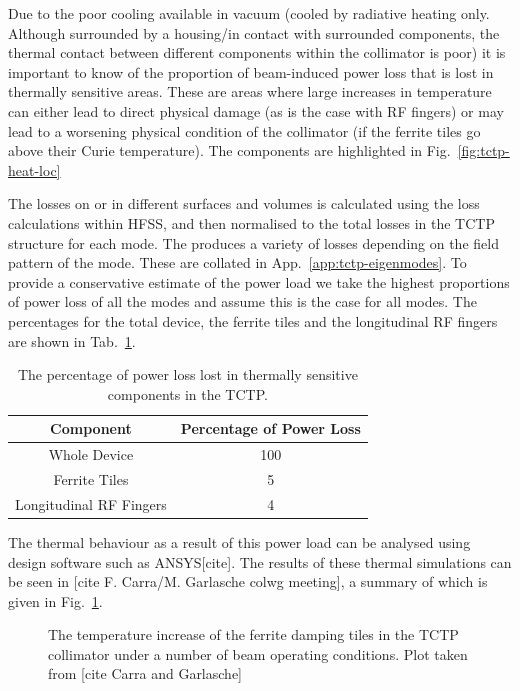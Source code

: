 Due to the poor cooling available in vacuum (cooled by radiative heating only. Although surrounded by a housing/in contact with surrounded components, the thermal contact between different components within the collimator is poor) it is important to know of the proportion of beam-induced power loss that is lost in thermally sensitive areas. These are areas where large increases in temperature can either lead to direct physical damage (as is the case with RF fingers) or may lead to a worsening physical condition of the collimator (if the ferrite tiles go above their Curie temperature). The components are highlighted in Fig.~\ref{fig:tctp-heat-loc}

The losses on or in different surfaces and volumes is calculated using the loss calculations within HFSS, and then normalised to the total losses in the TCTP structure for each mode. The produces a variety of losses depending on the field pattern of the mode. These are collated in App.~\ref{app:tctp-eigenmodes}. To provide a conservative estimate of the power load we take the highest proportions of power loss of all the modes and assume this is the case for all modes. The percentages for the total device, the ferrite tiles and the longitudinal RF fingers are shown in Tab.~\ref{tab:tctp-heating-loc}. 

\begin{table}
\label{tab:tctp-heating-loc}
\caption{The percentage of power loss lost in thermally sensitive components in the TCTP.}
\begin{center}
\begin{tabular}{c | c}
Component & Percentage of Power Loss \\ \hline
Whole Device & 100 \\ \hline
Ferrite Tiles & 5 \\ \hline
Longitudinal RF Fingers & 4 \\
\end{tabular}
\end{center}
\end{table}

The thermal behaviour as a result of this power load can be analysed using design software such as ANSYS[cite]. The results of these thermal simulations can be seen in [cite F. Carra/M. Garlasche colwg meeting], a summary of which is given in Fig.~\ref{fig:tctp-ferrite-temp-rise}.

\begin{figure}

\label{fig:tctp-ferrite-temp-rise}
\caption{The temperature increase of the ferrite damping tiles in the TCTP collimator under a number of beam operating conditions. Plot taken from [cite Carra and Garlasche]}
\end{figure}